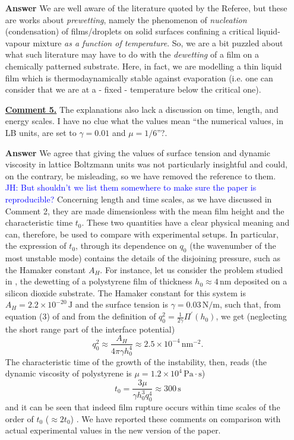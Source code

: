 \documentclass[12pt,english]{article}
\newcommand{\JH}[1]{\textcolor{blue}{JH: #1}}
\begin{document}
\begin{itemize}
\item[ \textbf{{Answer}}]
{
We are well aware of the literature quoted by the Referee, but these are works 
about {\it prewetting}, namely the phenomenon of {\it nucleation} (condensation)
of films/droplets on solid surfaces confining a critical liquid-vapour mixture
{\it as a function of temperature}. So, we are a bit puzzled about what such literature may have to do with the {\it dewetting} of a film on a chemically patterned substrate. Here, in fact, we are modelling a thin liquid film which is 
thermodaynamically stable against evaporation (i.e. one can consider that 
we are at a - fixed - temperature below the critical one).
}

\item[ \textbf{\underline{Comment 5.}}]
{ 
The explanations also lack a discussion on time, length, and energy scales. 
I have no clue what the values mean ``the numerical values, in LB units, are set to $\gamma= 0.01$ and $\mu = 1/6$''?. 
}

\item[ \textbf{{Answer}}]
{
We agree that giving the values of surface tension and dynamic viscosity 
in lattice Boltzmann units was not particularly insightful and could, on 
the contrary, be misleading, so we have removed the reference to them.
\JH{But shouldn't we list them somewhere to make sure the paper is reproducible?}
Concerning length and time scales, as we have discussed in Comment 2, 
they are made dimensionless 
with the mean film height and the characteristic time $t_0$. These two quantities 
have a clear physical meaning and can, therefore, be used to compare with 
experimental setups. In particular, the expression of $t_0$, through its dependence 
on $q_0$ (the wavenumber of the most unstable mode) contains the details 
of the disjoining pressure, such as the Hamaker constant $A_H$. For instance, let us consider the problem studied in \cite{becker2003complex}, the dewetting of a polystyrene film of thickness $h_0 \approx 4 \, \text{nm}$ deposited on a silicon 
dioxide substrate. The Hamaker constant for this system is 
$A_H  = 2.2 \times 10^{-20} \, \text{J}$ and the surface tension is 
$\gamma = 0.03 \, \text{N}/\text{m}$, such that, 
from equation (3) of \cite{becker2003complex} and 
from the definition of $q_0^2 = \frac{1}{2\gamma} \Pi^{\prime}(h_0)$, 
we get (neglecting the short range part of the interface potential)
$$
q_0^2 \approx \frac{A_H}{4\pi \gamma h_0^4} \approx 2.5 \times 10^{-4} \, \text{nm}^{-2}.
$$
The characteristic time of the growth of the instability, then, reads \cite{PhysRevLett.99.114503} (the dynamic viscosity of polystyrene is 
$\mu = 1.2 \times 10^4 \, \text{Pa} \cdot \text{s}$)
$$
t_0 = \frac{3\mu}{\gamma h_0^3 q_0^4} \approx 300 \, \text{s}
$$
and it can be seen that indeed film rupture occurs within time 
scales of the order of $t_0$ ($\approx 2 t_0$) \cite{becker2003complex}.
We have reported these comments on comparison with actual experimental 
values in the new version of the paper.
}



\end{itemize}
\end{document}
